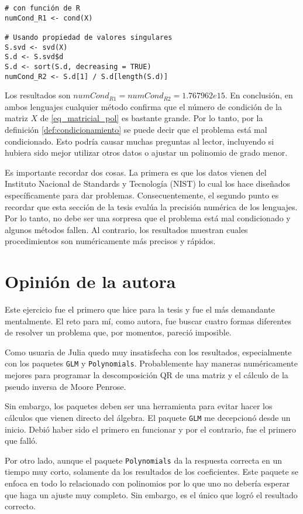 \begin{verbatim}
# con función de R
numCond_R1 <- cond(X)

# Usando propiedad de valores singulares
S.svd <- svd(X)
S.d <- S.svd$d
S.d <- sort(S.d, decreasing = TRUE)
numCond_R2 <- S.d[1] / S.d[length(S.d)]
\end{verbatim}

Los resultados son $numCond_{R1} = numCond_{R2} = 1.767962e{15}$. En conclusión, en ambos lenguajes cualquier método confirma que el número de condición de la matriz $X$ de \ref{eq_matricial_pol} es bastante grande. Por lo tanto, por la definición \ref{def:condicionamiento} se puede decir que el problema está mal condicionado. Esto podría causar muchas preguntas al lector, incluyendo si hubiera sido mejor utilizar otros datos o ajustar un polinomio de grado menor. 

Es importante recordar dos cosas. La primera es que los datos vienen del Instituto Nacional de Standards y Tecnología (NIST) lo cual los hace diseñados específicamente para dar problemas. Consecuentemente, el segundo punto es recordar que esta sección de la tesis evalúa la precisión numérica de los lenguajes. Por lo tanto, no debe ser una sorpresa que el problema está mal condicionado y algunos métodos fallen. Al contrario, los resultados muestran cuales procedimientos son numéricamente más precisos y rápidos.


\section{Opinión de la autora}

Este ejercicio fue el primero que hice para la tesis y fue el más demandante 
mentalmente. El reto para mí, como autora, fue buscar cuatro formas diferentes de resolver un problema que, por momentos, pareció imposible. 

Como usuaria de \textsf{Julia} quedo muy insatisfecha con los resultados, especialmente con los paquetes \texttt{GLM} y \texttt{Polynomials}. Probablemente hay maneras numéricamente mejores para programar la descomposición QR de una matriz y el cálculo de la pseudo inversa de Moore Penrose.

Sin embargo, los paquetes deben ser una herramienta para evitar hacer los cálculos que vienen directo del álgebra. El paquete \texttt{GLM} me decepcionó desde un inicio. Debió haber sido el primero en funcionar y por el contrario, fue el primero que falló. 

Por otro lado, aunque el paquete \texttt{Polynomials} da la respuesta correcta en un tiempo muy corto, solamente da los resultados de los coeficientes. Este paquete se enfoca en todo lo relacionado con polinomios por lo que uno no debería esperar que haga un ajuste muy completo. Sin embargo, es el único que logró el resultado correcto. 

